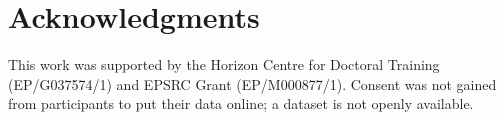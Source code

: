 \documentclass[../main/Feedback.tex]{subfiles}
\begin{document}
\section{Acknowledgments}
This work was supported by the Horizon Centre for Doctoral Training (EP/G037574/1) and EPSRC Grant (EP/M000877/1).
 Consent was not gained from participants to put their data online; a dataset is not openly available.
\end{document}
